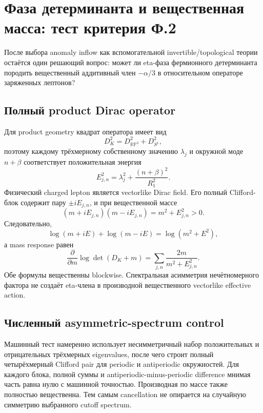 \chapter{Фаза детерминанта и вещественная масса: тест критерия Ф.2}

После выбора anomaly inflow как вспомогательной invertible/topological
теории остаётся один решающий вопрос: может ли eta-фаза фермионного
детерминанта породить вещественный аддитивный член \(-\alpha/3\) в
относительном операторе заряженных лептонов?

\section{Полный product Dirac operator}

Для product geometry квадрат оператора имеет вид
\begin{equation}
 D_K^2=D_{\mathbb{RP}^3}^2+D_{S^1}^2,
\end{equation}
поэтому каждому трёхмерному собственному значению \(\lambda_j\) и окружной
моде \(n+\beta\) соответствует положительная энергия
\begin{equation}
 E_{j,n}^2=\lambda_j^2+\frac{(n+\beta)^2}{R_1^2}.
\end{equation}
Физический charged lepton является vectorlike Dirac field. Его полный
Clifford-блок содержит пару \(\pm iE_{j,n}\), и при вещественной массе
\begin{equation}
 (m+iE_{j,n})(m-iE_{j,n})=m^2+E_{j,n}^2>0.
\end{equation}
Следовательно,
\begin{equation}
 \log(m+iE)+\log(m-iE)=\log(m^2+E^2),
\end{equation}
а mass response равен
\begin{equation}
 \frac{\partial}{\partial m}\log\det(D_K+m)
 =\sum_{j,n}\frac{2m}{m^2+E_{j,n}^2}.
\end{equation}
Обе формулы вещественны blockwise. Спектральная асимметрия нечётномерного
фактора не создаёт eta-члена в производной вещественного vectorlike
effective action.

\section{Численный asymmetric-spectrum control}

Машинный тест намеренно использует несимметричный набор положительных и
отрицательных трёхмерных eigenvalues, после чего строит полный
четырёхмерный Clifford pair для periodic и antiperiodic окружностей. Для
каждого блока, полной суммы и antiperiodic-minus-periodic difference мнимая
часть равна нулю с машинной точностью. Производная по массе также полностью
вещественна. Тем самым cancellation не опирается на случайную симметрию
выбранного cutoff spectrum.

